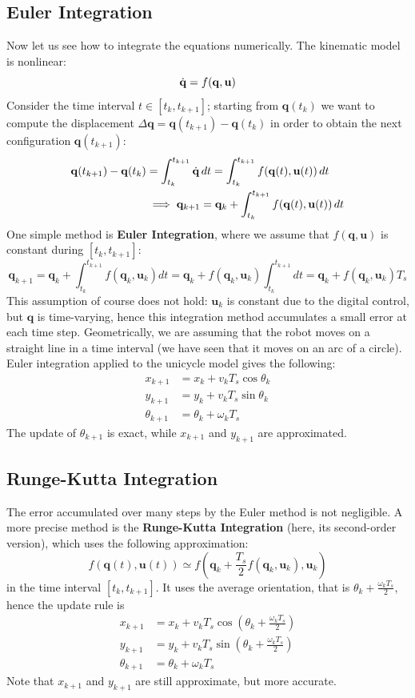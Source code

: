 \documentclass[10pt, a4paper]{report}
\newcommand{\q}{{\mathbf q}}
\begin{document}
\subsection{Euler Integration}
Now let us see how to integrate the equations numerically. The kinematic model is nonlinear:\begin{equation}
    \dq=f(\q,\mathbf u)
\end{equation}
Consider the time interval $t\in [t_k,t_{k+1}]$; starting from $\q(t_k)$ we want to compute the displacement $\Delta\q=\q(t_{k+1})-\q(t_k)$ in order to obtain the next configuration $\q(t_{k+1})$:\begin{align}
    \q(t_{k+1})-\q(t_k)&=\int_{t_k}^{t_{k+1}}\dq\, dt =  \int_{t_k}^{t_{k+1}}f(\q(t),\mathbf u(t))\, dt\\
    &\implies \q_{k+1}=\q_k+ \int_{t_k}^{t_{k+1}}f(\q(t),\mathbf u(t))\, dt
\end{align}
One simple method is \textbf{Euler Integration}, where we assume that $f(\q,\mathbf u)$ is constant during $[t_k,t_{k+1}]$:\begin{equation}
    \q_{k+1}=\q_k+ \int_{t_k}^{t_{k+1}}f(\q_k,\mathbf u_k) dt=\q_k+
   f(\q_k,\mathbf u_k) \int_{t_k}^{t_{k+1}}dt=\q_k+f(\q_k,\mathbf u_k)T_s 
\end{equation}
This assumption of course does not hold: $\mathbf u_k$ is constant due to the digital control, but $\q$ is time-varying, hence this integration method accumulates a small error at each time step. Geometrically, we are assuming that the robot moves on a straight line in a time interval (we have seen that it moves on an arc of a circle). Euler integration applied to the unicycle model gives the following:\begin{align}
    x_{k+1}&=x_k+v_kT_s\cos\theta_k\\ 
    y_{k+1}&=y_k+v_kT_s\sin\theta_k\\ 
    \theta_{k+1}&=\theta_k+\omega_kT_s
\end{align}
The update of $\theta_{k+1}$ is exact, while $x_{k+1}$ and $y_{k+1}$ are approximated.
\subsection{Runge-Kutta Integration}
The error accumulated over many steps by the Euler method is not negligible. A more precise method is the \textbf{Runge-Kutta Integration} (here, its second-order version), which uses the following approximation:\begin{equation}
    f(\q(t),\mathbf u(t))\simeq f\left(\q_k+\frac{T_s}{2}f(\q_k,\mathbf u_k),\mathbf u_k\right)
\end{equation}
in the time interval $[t_k,t_{k+1}]$. It uses the average orientation, that is $\theta_k+\frac{\omega_kT_s}{2}$, hence the update rule is\begin{align}
    x_{k+1}&=x_k+v_kT_s\cos\left(\theta_k+\frac{\omega_kT_s}{2}\right)\\ 
    y_{k+1}&=y_k+v_kT_s\sin\left(\theta_k+\frac{\omega_kT_s}{2}\right)\\ 
    \theta_{k+1}&=\theta_k+\omega_kT_s
\end{align}
Note that $x_{k+1}$ and $y_{k+1}$ are still approximate, but more accurate.
\end{document}
